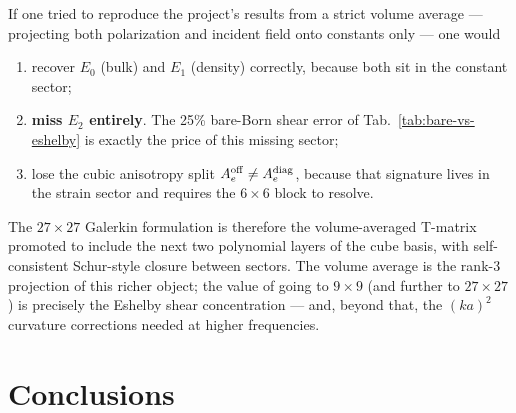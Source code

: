 \documentclass[11pt,a4paper]{article}
\begin{document}
If one tried to reproduce the project's results from a strict volume
average --- projecting both polarization and incident field onto
constants only --- one would
\begin{enumerate}[leftmargin=*,nosep]
\item recover $E_0$ (bulk) and $E_1$ (density) correctly, because both
sit in the constant sector;
\item \textbf{miss $E_2$ entirely}.  The 25\% bare-Born shear error of
Tab.~\ref{tab:bare-vs-eshelby} is exactly the price of this missing
sector;
\item lose the cubic anisotropy split $A_e^{\rm off} \neq A_e^{\rm diag}$,
because that signature lives in the strain sector and requires the
$6\times 6$ block to resolve.
\end{enumerate}
The $27\times 27$ Galerkin formulation is therefore the volume-averaged
T-matrix promoted to include the next two polynomial layers of the
cube basis, with self-consistent Schur-style closure between sectors.
The volume average is the rank-3 projection of this richer object;
the value of going to $9\times 9$ (and further to $27\times 27$) is
precisely the Eshelby shear concentration --- and, beyond that, the
$(ka)^2$ curvature corrections needed at higher frequencies.

\section{Conclusions}
\end{document}
